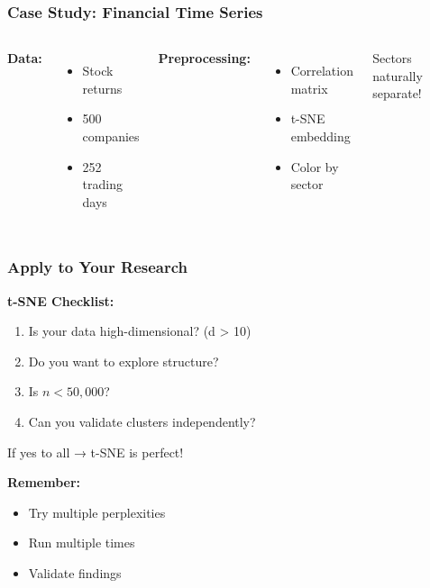 \documentclass[aspectratio=169]{beamer}
\begin{document}
\begin{frame}
\frametitle{Case Study: Financial Time Series}

\begin{columns}
\textbf{Data:}
\begin{itemize}
\item Stock returns
\item 500 companies
\item 252 trading days
\end{itemize}

\textbf{Preprocessing:}
\begin{itemize}
\item Correlation matrix
\item t-SNE embedding
\item Color by sector
\end{itemize}


Sectors naturally separate!
\end{columns}

\end{frame}

\begin{frame}
\frametitle{Apply to Your Research}

\begin{center}
\textbf{t-SNE Checklist:}
\end{center}

\begin{enumerate}
\item Is your data high-dimensional? (d > 10)
\item Do you want to explore structure?
\item Is $n < 50,000$?
\item Can you validate clusters independently?
\end{enumerate}

\vspace{0.3cm}
If yes to all → t-SNE is perfect!

\vspace{0.3cm}
\textbf{Remember:}
\begin{itemize}
\item Try multiple perplexities
\item Run multiple times
\item Validate findings
\end{itemize}

\end{frame}
\end{document}

